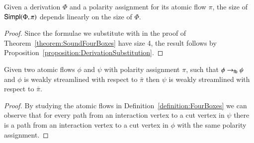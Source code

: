 
\begin{lemma}\label{lemma:SizeFourBoxes}
Given a derivation $\Phi$ and a polarity assignment for its atomic flow $\pi$, the size of $\mathsf{Simpl}(\Phi,\pi)$ depends linearly on the size of $\Phi$.
\end{lemma}

\begin{proof}
Since the formulae we substitute with in the proof of Theorem~\vref{theorem:SoundFourBoxes} have size 4, the result follows by Proposition~\vref{proposition:DerivationSubstitution}.
\end{proof}

\begin{lemma}\label{lemma:FourBoxesStreamlining}
Given two atomic flows $\phi$ and $\psi$ with polarity assignment $\pi$, such that $\phi\to_{\mathsf{fb}}\psi$ and $\phi$ is weakly streamlined with respect to $\bar\pi$ then $\psi$ is weakly streamlined with respect to $\bar\pi$.
\end{lemma}

\begin{proof}
By studying the atomic flows in Definition~\vref{definition:FourBoxes} we can observe that for every path from an interaction vertex to a cut vertex in $\psi$ there is a path from an interaction vertex to a cut vertex in $\phi$ with the same polarity assignment.
\end{proof}



